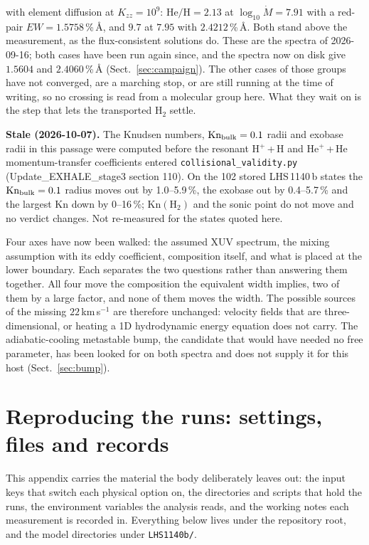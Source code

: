\documentclass[english,a4paper]{my_memo}
\begin{document}
\begin{itemize}
      with element diffusion at $K_{zz} = 10^{9}$:
      $\mathrm{He/H} = 2.13$ at $\log_{10}\dot M = 7.91$ with a red-pair
      $EW = 1.5758$\,\%\,\AA, and $9.7$ at $7.95$ with $2.4212$\,\%\,\AA.
      Both stand above the measurement, as the flux-consistent solutions do.
      These are the spectra of 2026-09-16; both cases have been run again
      since, and the spectra now on disk give $1.5604$ and
      $2.4060$\,\%\,\AA{} (Sect.~\ref{sec:campaign}).
      The other cases of those groups have not converged, are a marching
      stop, or are still running at the time of writing, so no crossing is
      read from a molecular group here. What they wait on is the step that
      lets the transported H$_2$ settle.
\end{itemize}

\noindent\textbf{Stale (2026-10-07).} The Knudsen numbers, $\mathrm{Kn}_{\rm bulk}=0.1$ radii and exobase radii in this passage were computed before the resonant H$^+$\,+\,H and He$^+$\,+\,He momentum-transfer coefficients entered \texttt{collisional\_validity.py} (Update\_EXHALE\_stage3 section 110). On the 102 stored LHS\,1140\,b states the $\mathrm{Kn}_{\rm bulk}=0.1$ radius moves out by 1.0--5.9\,\%, the exobase out by 0.4--5.7\,\% and the largest Kn down by 0--16\,\%; $\mathrm{Kn}(\mathrm{H_2})$ and the sonic point do not move and no verdict changes. Not re-measured for the states quoted here.

\noindent Four axes have now been walked: the assumed XUV spectrum, the
mixing assumption with its eddy coefficient, composition itself, and what is
placed at the lower boundary. Each separates the two questions rather than
answering them together. All four move the composition the equivalent width
implies, two of them by a large factor, and none of them moves the width. The
possible sources of the missing $22$\,km\,s$^{-1}$ are therefore unchanged:
velocity fields that are three-dimensional, or heating a 1D hydrodynamic
energy equation does not carry. The adiabatic-cooling metastable bump, the
candidate that would have needed no free parameter, has been looked for on
both spectra and does not supply it for this host (Sect.~\ref{sec:bump}).

\appendix

\section{Reproducing the runs: settings, files and records}
\label{app:repro}

This appendix carries the material the body deliberately leaves out: the
input keys that switch each physical option on, the directories and scripts
that hold the runs, the environment variables the analysis reads, and the
working notes each measurement is recorded in. Everything below lives under
the repository root, and the model directories under
\texttt{LHS1140b/}.
\end{document}
